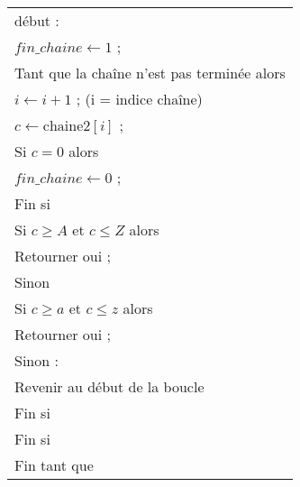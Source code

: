 \documentclass[a4paper, 12pt]{article}
\begin{document}
\begin{center}
  \begin{tabularx}{\textwidth}{|X|}
    \hline
    début : \\
    \hspace{1em}$fin\_chaine \leftarrow 1$ ;\\
    \hspace{1em}Tant que la chaîne n'est pas terminée alors \\
    \hspace{2em}$i \leftarrow i + 1$ ; (i = indice chaîne)\\
    \hspace{2em}$c \leftarrow \text{chaine2}[i]$ ; \\
    \hspace{2em}Si $c = 0$ alors \\
    \hspace{3em}$fin\_chaine \leftarrow 0$ ; \\
    \hspace{2em}Fin si \\
    \hspace{2em}Si $c \geq A$ et $c \leq Z$ alors \\
    \hspace{3em}Retourner oui ; \\
    \hspace{2em}Sinon \\
    \hspace{3em}Si $c \geq a$ et $c \leq z$ alors \\
    \hspace{4em}Retourner oui ; \\
    \hspace{3em}Sinon : \\
    \hspace{4em}Revenir au début de la boucle \\
    \hspace{3em}Fin si\\
    \hspace{2em}Fin si\\
    \hspace{1em}Fin tant que \\

    \hline
  \end{tabularx}
\end{center}
\end{document}
